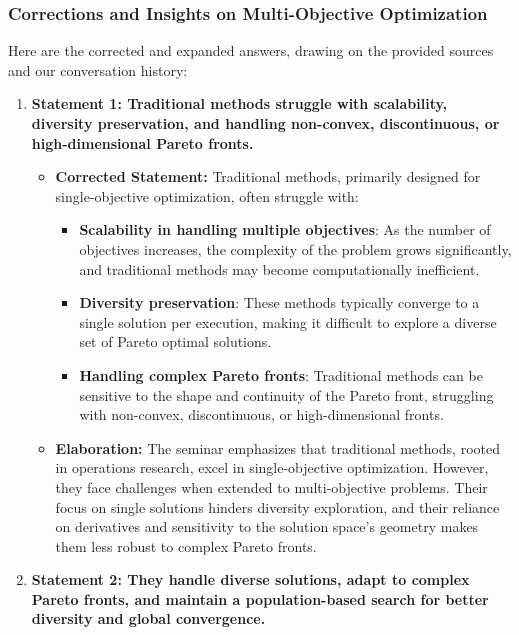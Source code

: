 \documentclass[
]{article}
\author{}
\date{}
\begin{document}
\subsubsection{Corrections and Insights on Multi-Objective
Optimization}\label{corrections-and-insights-on-multi-objective-optimization}

Here are the corrected and expanded answers, drawing on the provided
sources and our conversation history:

\begin{enumerate}
\def\labelenumi{\arabic{enumi}.}
\item
  \textbf{Statement 1: Traditional methods struggle with scalability,
  diversity preservation, and handling non-convex, discontinuous, or
  high-dimensional Pareto fronts.}

  \begin{itemize}
  
  \item
    \textbf{Corrected Statement:} Traditional methods, primarily
    designed for single-objective optimization, often struggle with:

    \begin{itemize}
    
    \item
      \textbf{Scalability in handling multiple objectives}: As the
      number of objectives increases, the complexity of the problem
      grows significantly, and traditional methods may become
      computationally inefficient.
    \item
      \textbf{Diversity preservation}: These methods typically converge
      to a single solution per execution, making it difficult to explore
      a diverse set of Pareto optimal solutions.
    \item
      \textbf{Handling complex Pareto fronts}: Traditional methods can
      be sensitive to the shape and continuity of the Pareto front,
      struggling with non-convex, discontinuous, or high-dimensional
      fronts.
    \end{itemize}
  \item
    \textbf{Elaboration:} The seminar emphasizes that traditional
    methods, rooted in operations research, excel in single-objective
    optimization. However, they face challenges when extended to
    multi-objective problems. Their focus on single solutions hinders
    diversity exploration, and their reliance on derivatives and
    sensitivity to the solution space's geometry makes them less robust
    to complex Pareto fronts.
  \end{itemize}
\item
  \textbf{Statement 2: They handle diverse solutions, adapt to complex
  Pareto fronts, and maintain a population-based search for better
  diversity and global convergence.}


\end{enumerate}
\end{document}
